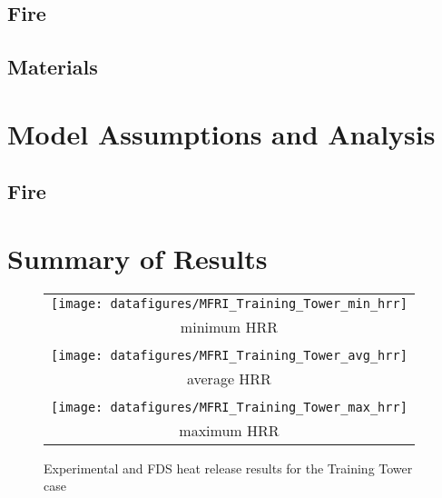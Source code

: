 \subsection{Fire}

\subsection{Materials}

\section{Model Assumptions and Analysis}

\subsection{Fire}


\section{Summary of Results}

\begin{figure}[\figoptions]
\begin{center}
\begin{tabular}{c}
 \texttt{[image: datafigures/MFRI\_Training\_Tower\_min\_hrr]}\\
 minimum HRR\\
 \\
 \texttt{[image: datafigures/MFRI\_Training\_Tower\_avg\_hrr]}\\
 average HRR\\
 \\
 \texttt{[image: datafigures/MFRI\_Training\_Tower\_max\_hrr]}\\
 maximum HRR\\
\end{tabular}
\end{center}
\caption {Experimental and FDS heat release results for the
Training Tower case}
\label{figtrainingtowerhrr}%
\end{figure}

